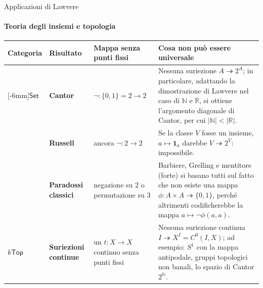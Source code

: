 \documentclass[italian,usepdftitle=false]{beamer}
\newcommand{\NN}{\mathbb{N}}
\newcommand{\RR}{\mathbb{R}}
\begin{document}
\begin{frame}{Applicazioni di Lawvere}
  \framesubtitle{Teoria degli insiemi e topologia}
  \scriptsize
  \renewcommand{\arraystretch}{1.30}
  \setlength{\tabcolsep}{4pt}
  \begin{tabularx}{\textwidth}{@{}>{\centering\arraybackslash}p{} >{\bfseries}L{.14\textwidth} L{.24\textwidth} Y@{}}
    \toprule
    \textcolor{maincolor}{\bfseries Categoria}
      & Risultato & Mappa senza punti fissi & Cosa non può essere universale \\
    \midrule
    [-6mm]{\textcolor{maincolor}{$\mathsf{Set}$}}
      & Cantor
      & $\neg : \{0,1\} = 2 \to 2$
      & Nessuna suriezione $A\twoheadrightarrow2^A$; in particolare, adattando la dimostrazione di Lawvere nel caso di $\NN$ e $\RR$,
      si ottiene l'argomento diagonale di Cantor, per cui $|\NN|<|\RR|$.\\
    & Russell
      & ancora $\neg:2\to2$
      & Se la classe $V$ fosse un insieme, $a\mapsto\mathbf1_a$ darebbe
        $V\twoheadrightarrow2^V$: impossibile. \\
    & Paradossi classici
      & negazione su $2$ o permutazione su $3$
      & Barbiere, Grelling e mentitore (forte) si basano tutti sul fatto che non esiste una mappa $\phi : A \times A \twoheadrightarrow \{0,1\}$,
      perché altrimenti codificherebbe la mappa $a \mapsto \neg\phi(a,a)$. \\
    \addlinespace[.7mm]
    \textcolor{maincolor}{$k\mathsf{Top}$}
      & Suriezioni continue
      & un $t:X\to X$ continuo senza punti fissi
      & Nessuna suriezione continua $I\twoheadrightarrow X^I = C^0(I,X)$;
        ad esempio: $S^1$ con la mappa antipodale, gruppi topologici non banali, lo spazio di Cantor $2^{\NN}$. \\
    \bottomrule
  \end{tabularx}
\end{frame}
\end{document}
